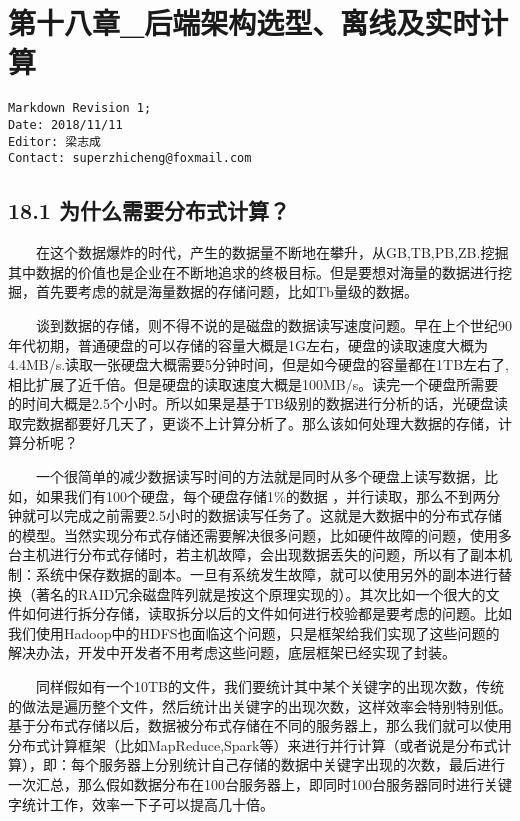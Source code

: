 \chapter{第十八章\_后端架构选型、离线及实时计算}\label{ux7b2cux5341ux516bux7ae0_ux540eux7aefux67b6ux6784ux9009ux578bux79bbux7ebfux53caux5b9eux65f6ux8ba1ux7b97}

\begin{verbatim}
Markdown Revision 1;
Date: 2018/11/11
Editor: 梁志成
Contact: superzhicheng@foxmail.com
\end{verbatim}

\section{18.1
为什么需要分布式计算？}\label{ux4e3aux4ec0ux4e48ux9700ux8981ux5206ux5e03ux5f0fux8ba1ux7b97}

  在这个数据爆炸的时代，产生的数据量不断地在攀升，从GB,TB,PB,ZB.挖掘其中数据的价值也是企业在不断地追求的终极目标。但是要想对海量的数据进行挖掘，首先要考虑的就是海量数据的存储问题，比如Tb量级的数据。

  谈到数据的存储，则不得不说的是磁盘的数据读写速度问题。早在上个世纪90年代初期，普通硬盘的可以存储的容量大概是1G左右，硬盘的读取速度大概为4.4MB/s.读取一张硬盘大概需要5分钟时间，但是如今硬盘的容量都在1TB左右了,相比扩展了近千倍。但是硬盘的读取速度大概是100MB/s。读完一个硬盘所需要的时间大概是2.5个小时。所以如果是基于TB级别的数据进行分析的话，光硬盘读取完数据都要好几天了，更谈不上计算分析了。那么该如何处理大数据的存储，计算分析呢？

  一个很简单的减少数据读写时间的方法就是同时从多个硬盘上读写数据，比如，如果我们有100个硬盘，每个硬盘存储1\%的数据
，并行读取，那么不到两分钟就可以完成之前需要2.5小时的数据读写任务了。这就是大数据中的分布式存储的模型。当然实现分布式存储还需要解决很多问题，比如硬件故障的问题，使用多台主机进行分布式存储时，若主机故障，会出现数据丢失的问题，所以有了副本机制：系统中保存数据的副本。一旦有系统发生故障，就可以使用另外的副本进行替换（著名的RAID冗余磁盘阵列就是按这个原理实现的）。其次比如一个很大的文件如何进行拆分存储，读取拆分以后的文件如何进行校验都是要考虑的问题。比如我们使用Hadoop中的HDFS也面临这个问题，只是框架给我们实现了这些问题的解决办法，开发中开发者不用考虑这些问题，底层框架已经实现了封装。

  同样假如有一个10TB的文件，我们要统计其中某个关键字的出现次数，传统的做法是遍历整个文件，然后统计出关键字的出现次数，这样效率会特别特别低。基于分布式存储以后，数据被分布式存储在不同的服务器上，那么我们就可以使用分布式计算框架（比如MapReduce,Spark等）来进行并行计算（或者说是分布式计算），即：每个服务器上分别统计自己存储的数据中关键字出现的次数，最后进行一次汇总，那么假如数据分布在100台服务器上，即同时100台服务器同时进行关键字统计工作，效率一下子可以提高几十倍。

